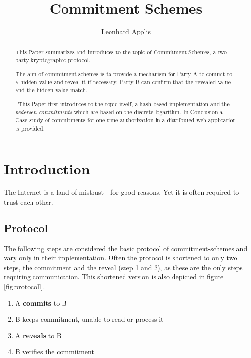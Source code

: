 \documentclass[conference]{IEEEtran}
\begin{document}
\title{Commitment Schemes}

\author{Leonhard Applis}

\maketitle

\begin{abstract}
This Paper summarizes and  introduces to  the topic of Commitment-Schemes, a two party kryptographic protocol. 

The aim of commitment schemes is to provide a mechanism for Party A to commit to a hidden value and reveal it if necessary. Party B can confirm that the revealed value and the hidden value match.

~\newline This Paper first introduces to the topic itself, a hash-based implementation and the \textit{pedersen-commitments} which are based on the discrete logarithm. In Conclusion a Case-study of commitments for one-time authorization in a distributed web-application is provided. 
\end{abstract}

\section{Introduction}
The Internet is a land of mistrust - for good reasons. Yet it is often required to trust each other. 

\subsection{Protocol}
The following steps are considered the basic protocol of commitment-schemes and vary only in their implementation. Often the protocol is shortened to only two steps, the commitment and the reveal (step 1 and 3), as these are the only steps requiring communication. This shortened version is also depicted in figure \ref{fig:protocoll}.  
\begin{enumerate}
	\item A \textbf{commits} to B
	\item B keeps commitment, unable to read or process it
	\item A \textbf{reveals} to B
	\item B verifies the commitment 
\end{enumerate}
\end{document}
